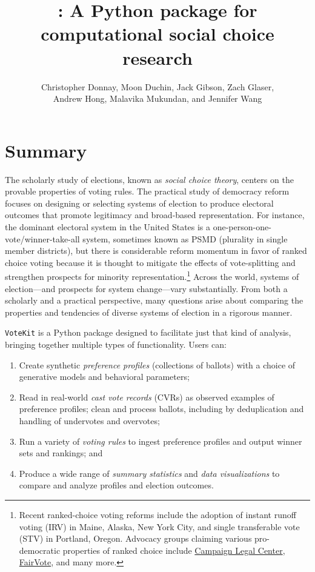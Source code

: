 \documentclass{article}
\title{\VK:  A Python package for computational social choice research}
\author{Christopher Donnay, Moon Duchin, Jack Gibson, Zach Glaser,\\ Andrew Hong, Malavika Mukundan, and Jennifer Wang}
\newcommand{\VK}{{\tt VoteKit}\xspace}
\begin{document}
\maketitle
\section{Summary}


The scholarly study of elections, known as {\em social choice theory}, centers on the  provable properties of voting rules.  The practical study of democracy reform focuses on designing or selecting systems of election to produce electoral outcomes that promote legitimacy and broad-based representation.
For instance, the dominant electoral system in the United States is a one-person-one-vote/winner-take-all system, sometimes known as PSMD (plurality in single member districts), but there is considerable reform momentum in favor of ranked choice voting because it is thought to mitigate the effects of vote-splitting and strengthen prospects for minority representation.\footnote{Recent ranked-choice voting reforms include the adoption of instant runoff voting (IRV) in Maine, Alaska, New York City, and single transferable vote (STV) in Portland, Oregon. Advocacy groups claiming various pro-democratic properties of ranked choice include \href{https://perma.cc/77MM-DCPH}{Campaign Legal Center}, \href{https://perma.cc/L66Z-AB4R}{FairVote}, and many more.}
Across the world, systems of election---and prospects for system change---vary substantially.
From both a scholarly and a practical perspective, many questions arise about comparing the properties and tendencies of diverse systems of election in a rigorous manner.


\VK \cite{VoteKit} is a Python package designed to facilitate just that kind of analysis, bringing together multiple types of functionality.  Users can:
\begin{enumerate}
    \item Create synthetic {\em preference profiles} (collections of ballots) with a choice of generative models and behavioral parameters;
    \item Read in real-world {\em cast vote records} (CVRs) as observed examples of preference profiles; clean and process ballots, including by deduplication and handling of undervotes and overvotes;
    \item Run a variety of {\em voting rules} to ingest preference profiles and output  winner sets and rankings; \quad and
    \item Produce a wide range of {\em summary statistics} and {\em data visualizations} to compare and analyze profiles and election outcomes.
\end{enumerate}
\end{document}

